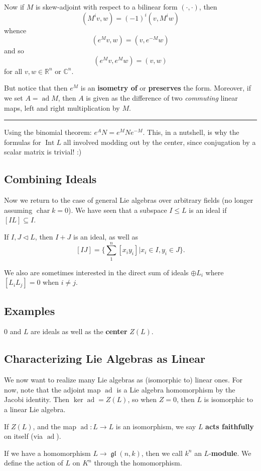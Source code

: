 \documentclass[12pt]{article}
\theoremstyle{nonumberbreak}
\theoremstyle{changebreak}
\theoremstyle{nonumberbreak}
\theoremstyle{change}
\newcommand*{\R}{
\mathbb{R}
}
\newcommand*{\C}{
\mathbb{C}
}
\newcommand*{\brk}{
\rule{2in}{.1pt}
}
\DeclareMathOperator{\ch}{char}
\DeclareMathOperator{\gl}{\mathfrak{gl}}
\DeclareMathOperator{\ad}{ad}
\DeclareMathOperator{\Int}{Int}
\begin{document}
Now if $M$ is skew-adjoint with respect to a bilinear form $(\cdot,\cdot)$, then 
\[(M^iv,w)=(-1)^i(v,M^iw)\]
whence
\[(e^Mv, w)=(v,e^{-M}w)\]
and so 
\[(e^Mv,e^Mw)=(v,w)\]
for all $v,w\in\R^n$ or $\C^n$.

But notice that then $e^M$ is an \textbf{isometry of} or \textbf{preserves} the form. Moreover, 
if we set $A=\ad M$, then $A$ is given as the difference of two \textit{commuting} linear maps, 
left and right multiplication by $M$.

\brk

Using the binomial theorem: $e^AN=e^MNe^{-M}$. This, in a nutshell, is why the formulas for
$\Int L$ all involved modding out by the center, since conjugation by a scalar matrix is trivial! :)

\subsection{Combining Ideals}
Now we return to the case of general Lie algebras over arbitrary fields (no longer assuming $\ch k=0$). 
We have seen that a subspace $I\le L$ is an ideal if $[IL]\subseteq I$.

If $I,J\lhd L$, then $I+J$ is an ideal, as well as
\[[IJ]=\{\sum_1^n [x_iy_i]|x_i\in I, y_i\in J\}.\]

We also are sometimes interested in the direct sum of ideals $\oplus L_i$ where $[L_iL_j]=0$ when $i\ne j$.

\subsection{Examples}
$0$ and $L$ are ideals as well as the \textbf{center} $Z(L)$.

\subsection{Characterizing Lie Algebras as Linear}
We now want to realize many Lie algebras as (isomorphic to) linear ones. For now, note that the adjoint map $\ad$
is a Lie algebra homomorphism by the Jacobi identity. Then $\ker\ad=Z(L)$, so when $Z=0$, then $L$ is isomorphic to 
a linear Lie algebra. 

\begin{defn}
	If $Z(L)$, and the map $\ad:L\to L$ is an isomorphism, we say $L$ \textbf{acts faithfully}
	on itself (via $\ad$).
\end{defn}

\begin{defn}
	If we have a homomorphism $L\to\gl(n,k)$, then we call $k^n$ an $L$-\textbf{module}.
	We define the action of $L$ on $K^n$ through the homomorphism.
\end{defn}
\end{document}
